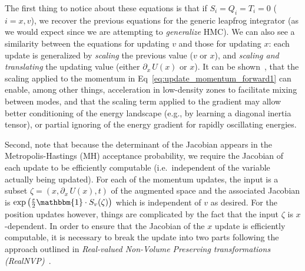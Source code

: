 \documentclass[../main.tex]{subfiles}
\begin{document}
The first thing to notice about these equations is that if $S_{i} = Q_{i} =
T_{i} = 0$ ($i = x, v$), we recover the previous equations for the generic
leapfrog integrator (as we would expect since we are attempting to
\emph{generalize} HMC).
%
We can also see a similarity between the equations for updating $v$ and those
for updating $x$: each update is generalized by \emph{scaling} the previous
value ($v$ or $x$), and \emph{scaling and translating} the updating value
(either $\partial_{x}\,U(x)$ or $x$).
%
It can be shown~\cite{2017arXiv171109268L}, that the scaling applied to the
momentum in Eq~\ref{eq:update_momentum_forward1} can enable, among other
things, acceleration in low-density zones to facilitate mixing between modes,
and that the scaling term applied to the gradient may allow better conditioning
of the energy landscape (e.g., by learning a diagonal inertia tensor), or
partial ignoring of the energy gradient for rapidly oscillating energies.

Second, note that because the determinant of the Jacobian appears in the
Metropolis-Hastings (MH) acceptance probability, we require the Jacobian of
each update to be efficiently computable (i.e.\ independent of the variable
actually being updated).
%
For each of the momentum updates, the input is a subset $\zeta = (x,
\partial_{x}\,U(x), t)$ of the augmented space and the associated Jacobian is
$\exp{\left(\frac{\eps}{2}\mathbbm{1}\cdot S_{v}(\zeta)\right)}$ which is
independent of $v$ as desired.
%
For the position updates however, things are complicated by the fact that the
input $\zeta$ is $x$-dependent.
%
In order to ensure that the Jacobian of the $x$ update is efficiently
computable, it is necessary to break the update into two parts following the
approach outlined in \emph{Real-valued Non-Volume Preserving transformations
(RealNVP)}~\cite{dinhRealNVP}.
%
\end{document}
